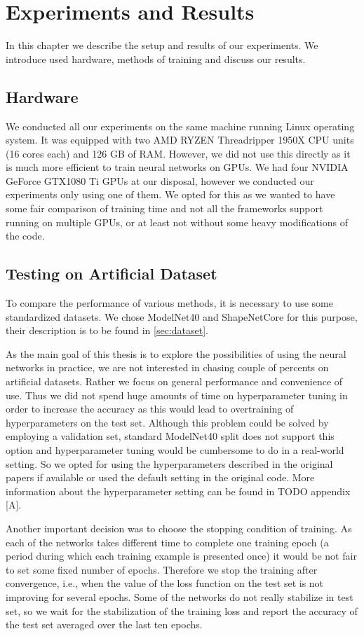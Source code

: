 \chapter{Experiments and Results}
\label{sec:chap5}
In this chapter we describe the setup and results of our experiments. We introduce used hardware, methods of training and discuss our results.

\section{Hardware}
We conducted all our experiments on the same machine running Linux operating system. It was equipped with two AMD RYZEN Threadripper 1950X CPU units (16 cores each) and 126 GB of RAM. However, we did not use this directly as it is much more efficient to train neural networks on GPUs. We had four NVIDIA GeForce GTX1080 Ti GPUs at our disposal, however we conducted our experiments only using one of them. We opted for this as we wanted to have some fair comparison of training time and not all the frameworks support running on multiple GPUs, or at least not without some heavy modifications of the code. 

\section{Testing on Artificial Dataset}
To compare the performance of various methods, it is necessary to use some standardized datasets. We chose ModelNet40 and ShapeNetCore for this purpose, their description is to be found in \autoref{sec:dataset}. \par
As the main goal of this thesis is to explore the possibilities of using the neural networks in practice, we are not interested in chasing couple of percents on artificial datasets. Rather we focus on general performance and convenience of use. Thus we did not spend huge amounts of time on hyperparameter tuning in order to increase the accuracy as this would lead to overtraining of hyperparameters on the test set. Although this problem could be solved by employing a validation set, standard ModelNet40 split does not support this option and hyperparameter tuning would be cumbersome to do in a real-world setting. So we opted for using the hyperparameters described in the original papers if available or used the default setting in the original code. More information about the hyperparameter setting can be found in TODO appendix [A]. \par
Another important decision was to choose the stopping condition of training. As each of the networks takes different time to complete one training epoch (a period during which each training example is presented once) it would be not fair to set some fixed number of epochs. Therefore we stop the training after convergence, i.e., when the value of the loss function on the test set is not improving for several epochs. Some of the networks do not really stabilize in test set, so we wait for the stabilization of the training loss and report the accuracy of the test set averaged over the last ten epochs.

